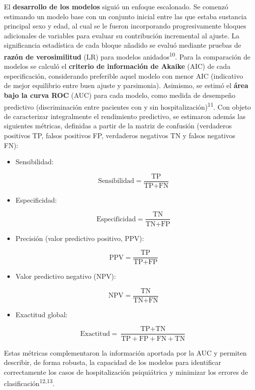 \documentclass[
  spanish,
  10pt,
]{article}
\begin{document}
El \textbf{desarrollo de los modelos} siguió un enfoque escalonado. Se
comenzó estimando un modelo base con un conjunto inicial entre las que
estaba sustancia principal sexo y edad, al cual se le fueron
incorporando progresivamente bloques adicionales de variables para
evaluar su contribución incremental al ajuste. La significancia
estadística de cada bloque añadido se evaluó mediante pruebas de
\textbf{razón de verosimilitud} (LR) para modelos
anidados\textsuperscript{10}. Para la comparación de modelos se calculó
el \textbf{criterio de información de Akaike} (AIC) de cada
especificación, considerando preferible aquel modelo con menor AIC
(indicativo de mejor equilibrio entre buen ajuste y parsimonia).
Asimismo, se estimó el \textbf{área bajo la curva ROC} (AUC) para cada
modelo, como medida de desempeño predictivo (discriminación entre
pacientes con y sin hospitalización)\textsuperscript{11}. Con objeto de
caracterizar integralmente el rendimiento predictivo, se estimaron
además las siguientes métricas, definidas a partir de la matriz de
confusión (verdaderos positivos TP, falsos positivos FP, verdaderos
negativos TN y falsos negativos FN):

\begin{itemize}
\item
  Sensibilidad:

  \[
  \text{Sensibilidad} = \frac{\text{TP}}{\text{TP}+\text{FN}}
  \]
\item
  Especificidad:

  \[
  \text{Especificidad} = \frac{\text{TN}}{\text{TN}+\text{FP}}
  \]
\item
  Precisión (valor predictivo positivo, PPV):

  \[
  \text{PPV} = \frac{\text{TP}}{\text{TP}+\text{FP}}
  \]
\item
  Valor predictivo negativo (NPV):

  \[
  \text{NPV} = \frac{\text{TN}}{\text{TN}+\text{FN}}
  \]
\item
  Exactitud global:

  \[
  \text{Exactitud} = \frac{\text{TP}+\text{TN}}{\text{TP}+\text{FP}+\text{FN}+\text{TN}}
  \]
\end{itemize}

Estas métricas complementaron la información aportada por la AUC y
permiten describir, de forma robusta, la capacidad de los modelos para
identificar correctamente los casos de hospitalización psiquiátrica y
minimizar los errores de clasificación\textsuperscript{12,13}.
\end{document}

